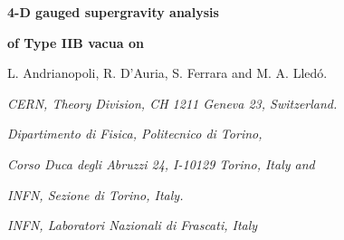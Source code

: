 \documentclass[a4paper,12pt]{article}
\begin{document}


\providecommand{\id}{\relax{\rm 1\kern-.28em 1}}

\providecommand{\R}{\mathbb{R}}
\providecommand{\C}{\mathbb{C}}
\providecommand{\Z}{\mathbb{Z}}


\providecommand{\K}{\mathbf{K3}}
\providecommand{\T}{\mathbf{T}}


\providecommand{\rSO}{\mathrm{SO}}
\providecommand{\rGL}{\mathrm{GL}}
\providecommand{\rSL}{\mathrm{SL}}
\providecommand{\rSU}{\mathrm{SU}}
\providecommand{\rSp}{\mathrm{Sp}}
\providecommand{\rUSp}{\mathrm{USp}}
\providecommand{\rU}{\mathrm{U}}

\providecommand{\fsu}{\mathfrak{su}}
\providecommand{\fso}{\mathfrak{so}}
\providecommand{\fh}{\mathfrak{h}}
\providecommand{\fp}{\mathfrak{p}}

\providecommand{\cM}{\mathcal{M}}
\providecommand{\cN}{\mathcal{N}}
\providecommand{\cL}{\mathcal{L}}
\providecommand{\cH}{\mathcal{H}}

\vskip 1cm


  \centerline{\LARGE \bf 4-D gauged supergravity analysis
  }

  \bigskip

  \centerline{\LARGE \bf  of Type IIB vacua on  \myHighlight{$\K\times \T^2/\Z_2$}\coordHE{}
  }


 \vskip 1.5cm
\centerline{L. Andrianopoli\myHighlight{$^\flat$}\coordHE{}, R. D'Auria\myHighlight{$^\sharp$}\coordHE{},  S.
Ferrara\myHighlight{$^{\flat \star}$}\coordHE{} and M. A. Lled\'o\myHighlight{$^\sharp$}\coordHE{}.}

\vskip 1cm

\centerline{\it \myHighlight{$^\flat$}\coordHE{} CERN, Theory Division, CH 1211 Geneva 23,
Switzerland.}

\bigskip



\centerline{\it \myHighlight{$^\sharp$}\coordHE{} Dipartimento di Fisica, Politecnico di
Torino,} \centerline{\it Corso Duca degli Abruzzi 24, I-10129
Torino, Italy  and  } \centerline{\it   INFN, Sezione di Torino,
Italy. }

\bigskip




\centerline{\myHighlight{$^\star$}\coordHE{}\it INFN, Laboratori Nazionali di Frascati,
Italy}







\vskip 1.5cm
\end{document}
